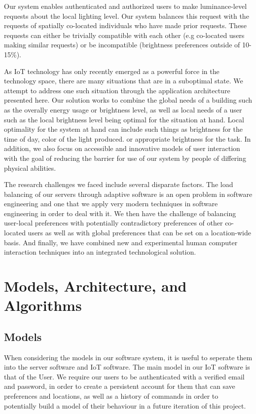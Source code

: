 \documentclass[10pt,twocolumn,letterpaper]{article}
\begin{document}
Our system enables authenticated and authorized users to make luminance-level
requests about the local lighting level. Our system balances this request with
the requests of spatially co-located individuals who have made prior requests.
These requests can either be trivially compatible with each other (e.g
co-located users making similar requests) or be incompatible (brightness
preferences outside of 10-15\%).

As IoT technology has only recently emerged as a powerful force in the
technology space, there are many situations that are in a suboptimal state. We
attempt to address one such situation through the application architecture
presented here. Our solution works to combine the global needs of a building
such as the overally energy usage or brightness level, as well as local needs of
a user such as the local brightness level being optimal for the situation at
hand. Local optimality for the system at hand can include such things as
brightness for the time of day, color of the light produced. or appropriate
brightness for the task. In addition, we also focus on accessible and innovative
models of user interaction with the goal of reducing the barrier for use of our
system by people of differing physical abilities.

The research challenges we faced include several disparate factors. The load
balancing of our servers through adaptive software is an open problem in
software engineering and one that we apply very modern techniques in software
engineering in order to deal with it. We then have the challenge of balancing
user-local preferences with potentially contradictory preferences of other
co-located users as well as with global preferences that can be set on a
location-wide basis. And finally, we have combined new and experimental human
computer interaction techniques into an integrated technological solution.

\section{Models, Architecture, and Algorithms}
\subsection{Models}
When considering the models in our software system, it is useful to seperate
them into the server software and IoT software. The main model in our IoT
software is that of the User. We require our users to be authenticated with a
verified email and password, in order to create a persistent account for them
that can save preferences and locations, as well as a history of commands in
order to potentially build a model of their behaviour in a future iteration of
this project.
\end{document}
